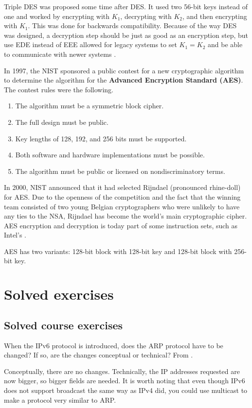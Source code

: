 \documentclass[12pt, oneside]{book}
\begin{document}
Triple DES was proposed some time after DES. It used two 56-bit keys instead of one and worked by encrypting with \(K_1\), decrypting with \(K_2\), and then encrypting with \(K_1\).
This was done for backwards compatibility.
Because of the way DES was designed, a decryption step should be just as good as an encryption step, but use EDE instead of EEE allowed for legacy systems to set \(K_1 = K_2\) and be able to communicate with newer systems \cite[p.~783]{computer-networks-tanenbaum-2012}.

In 1997, the NIST sponsored a public contest for a new cryptographic algorithm to determine the algorithm for the \textbf{Advanced Encryption Standard (AES)}.
The contest rules were the following.

\begin{enumerate}
\item The algorithm must be a symmetric block cipher.
\item The full design must be public.
\item Key lengths of 128, 192, and 256 bits must be supported.
\item Both software and hardware implementations must be possible.
\item The algorithm must be public or licensed on nondiscriminatory terms.
\end{enumerate}

In 2000, NIST announced that it had selected Rijndael (pronounced rhine-doll) for AES.
Due to the openness of the competition and the fact that the winning team consisted of two young Belgian cryptographers who were unlikely to have any ties to the NSA, Rijndael has become the world's main cryptographic cipher.
AES encryption and decryption is today part of some instruction sets, such as Intel's \cite[p.~784]{computer-networks-tanenbaum-2012}.

AES has two variants: 128-bit block with 128-bit key and 128-bit block with 256-bit key.

\section{Solved exercises}

\subsection{Solved course exercises}
\setcounter{Exercise}{0}

\begin{Exercise}
When the IPv6 protocol is introduced, does the ARP protocol have to be changed?
If so, are the changes conceptual or technical?
From \cite{computer-networks-tanenbaum-2012}.
\end{Exercise}
\begin{Answer}
Conceptually, there are no changes.
Technically, the IP addresses requested are now bigger, so bigger fields are needed.
It is worth noting that even though IPv6 does not support broadcast the same way as IPv4 did, you could use multicast to make a protocol very similar to ARP.
\end{Answer}
\end{document}

